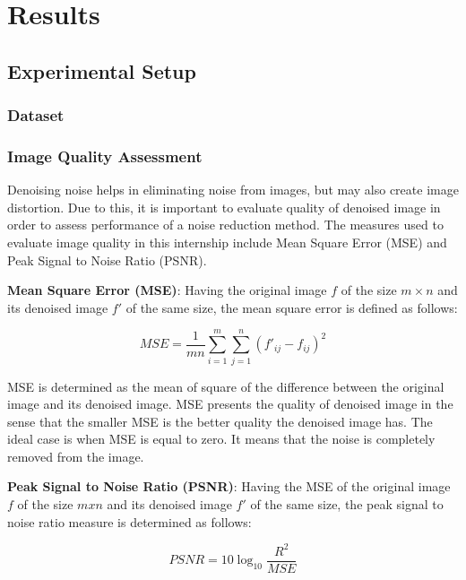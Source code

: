\chapter{Results}
\label{chapter_4}

\section{Experimental Setup}

\subsection{Dataset}

\subsection{Image Quality Assessment}

Denoising noise helps in eliminating noise from images, but may also create image distortion. Due to this, it is important to evaluate quality of denoised image in order to assess performance of a noise reduction method. The measures used to evaluate image quality in this internship include Mean Square Error (MSE) and Peak Signal to Noise Ratio (PSNR).

\textbf{Mean Square Error (MSE)}: Having the original image $f$ of the size $m \times n$ and its denoised image $f'$ of the same size, the mean square error is defined as follows:

\begin{equation}
    MSE = \frac{1}{mn}{\sum_{i=1}^{m}\sum_{j=1}^{n}(f'_{ij}-f_{ij})^2} 
\end{equation}

MSE is determined as the mean of square of the difference between the original image and its denoised image. MSE presents the quality of denoised image in the sense that the smaller MSE is the better quality the denoised image has. The ideal case is when MSE is equal to zero. It means that the noise is completely removed from the image.

\textbf{Peak Signal to Noise Ratio (PSNR)}: Having the MSE of the original image $f$ of the size $mxn$ and its denoised image $f'$ of the same size, the peak signal to noise ratio measure is determined as follows:

\begin{equation}
    PSNR = 10 \log_{10}\frac{R^2}{MSE}
\end{equation}

